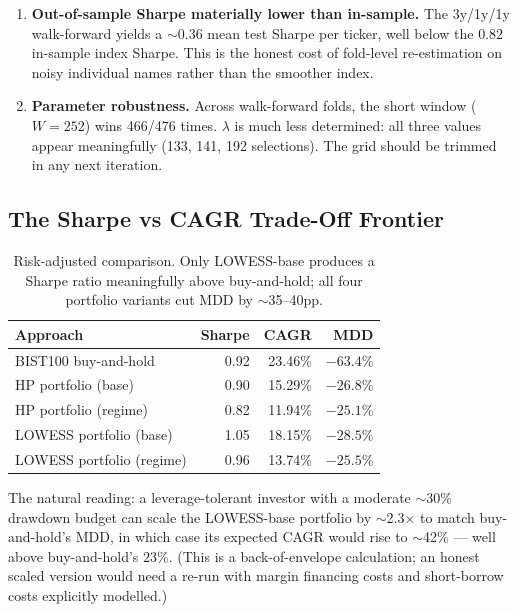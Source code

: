 \documentclass[11pt,a4paper]{article}
\begin{document}
\begin{enumerate}[leftmargin=1.5em,itemsep=4pt]
\item \textbf{Out-of-sample Sharpe materially lower than in-sample.} The
3y/1y/1y walk-forward yields a $\sim$0.36 mean test Sharpe per ticker, well
below the $0.82$ in-sample index Sharpe. This is the honest cost of fold-level
re-estimation on noisy individual names rather than the smoother index.

\item \textbf{Parameter robustness.} Across walk-forward folds, the short
window ($W{=}252$) wins 466/476 times. $\lambda$ is much less determined:
all three values appear meaningfully (133, 141, 192 selections). The grid
should be trimmed in any next iteration.

\end{enumerate}

\subsection{The Sharpe vs CAGR Trade-Off Frontier}

\begin{table}[h]
\centering
\begin{tabular}{@{}lrrr@{}}
\toprule
\textbf{Approach} & \textbf{Sharpe} & \textbf{CAGR} & \textbf{MDD} \\
\midrule
BIST100 buy-and-hold        & 0.92 & 23.46\% & $-63.4\%$ \\
HP portfolio (base)         & 0.90 & 15.29\% & $-26.8\%$ \\
HP portfolio (regime)       & 0.82 & 11.94\% & $-25.1\%$ \\
LOWESS portfolio (base)     & 1.05 & 18.15\% & $-28.5\%$ \\
LOWESS portfolio (regime)   & 0.96 & 13.74\% & $-25.5\%$ \\
\bottomrule
\end{tabular}
\caption{Risk-adjusted comparison. Only LOWESS-base produces a Sharpe
ratio meaningfully above buy-and-hold; all four portfolio variants cut MDD by
$\sim$35--40pp.}
\end{table}

The natural reading: a leverage-tolerant investor with a moderate $\sim$30\%
drawdown budget can scale the LOWESS-base portfolio by $\sim$2.3$\times$ to
match buy-and-hold's MDD, in which case its expected CAGR would rise to
$\sim$42\% --- well above buy-and-hold's $23\%$. (This is a back-of-envelope
calculation; an honest scaled version would need a re-run with margin
financing costs and short-borrow costs explicitly modelled.)
\end{document}

